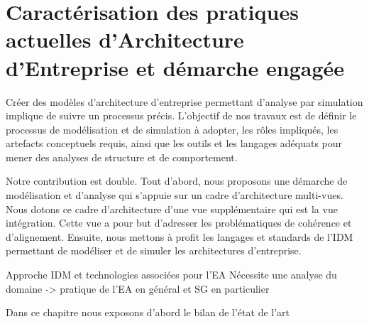 \chapter{Caractérisation des pratiques actuelles d'Architecture d'Entreprise et démarche engagée}
\label{ch:demarche}

\PartialToc



Créer des modèles d'architecture d'entreprise permettant d'analyse par
simulation implique de suivre un processus précis. L'objectif de nos travaux est
de définir le processus de modélisation et de simulation à adopter, les rôles
impliqués, les artefacts conceptuels requis, ainsi que les outils et les
langages adéquats pour mener des analyses de structure et de comportement.

Notre contribution est double. Tout d'abord, nous proposons une démarche de
modélisation et d'analyse qui s'appuie sur un cadre d'architecture multi-vues.
Nous dotons ce cadre d'architecture d'une vue supplémentaire qui est la vue
intégration. Cette vue a pour but d'adresser les problématiques de cohérence et
d'alignement. Ensuite, nous mettons à profit les langages et standards de l'IDM
permettant de modéliser et de simuler les architectures d'entreprise.

	Approche IDM et technologies associées pour l'EA Nécessite une analyse du
	domaine -> pratique de l'EA en général et SG en particulier


Dans ce chapitre nous exposons d'abord le bilan de l'état de l'art





















